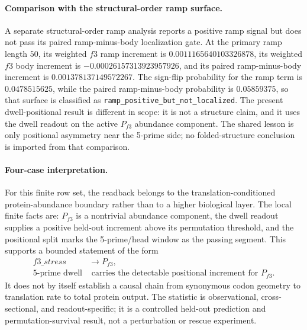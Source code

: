 \paragraph{Comparison with the structural-order ramp surface.}
A separate structural-order ramp analysis reports a positive ramp signal but does not pass its paired ramp-minus-body localization gate.  At the primary ramp length $50$, its weighted $f3$ ramp increment is $0.0011165640103326878$, its weighted $f3$ body increment is $-0.00026157313923957926$, and its paired ramp-minus-body increment is $0.001378137149572267$.  The sign-flip probability for the ramp term is $0.0478515625$, while the paired ramp-minus-body probability is $0.05859375$, so that surface is classified as \texttt{ramp\_positive\_but\_not\_localized}.  The present dwell-positional result is different in scope: it is not a structure claim, and it uses the dwell readout on the active $P_{f3}$ abundance component.  The shared lesson is only positional asymmetry near the 5-prime side; no folded-structure conclusion is imported from that comparison.

\paragraph{Four-case interpretation.}
For this finite row set, the readback belongs to the translation-conditioned protein-abundance boundary rather than to a higher biological layer.  The local finite facts are: $P_{f3}$ is a nontrivial abundance component, the dwell readout supplies a positive held-out increment above its permutation threshold, and the positional split marks the 5-prime/head window as the passing segment.  This supports a bounded statement of the form
$$
\begin{aligned}
f3\_stress &\longrightarrow P_{f3},\\
\text{5-prime dwell} &\text{ carries the detectable positional increment for } P_{f3}.
\end{aligned}
$$
It does not by itself establish a causal chain from synonymous codon geometry to translation rate to total protein output.  The statistic is observational, cross-sectional, and readout-specific; it is a controlled held-out prediction and permutation-survival result, not a perturbation or rescue experiment.

